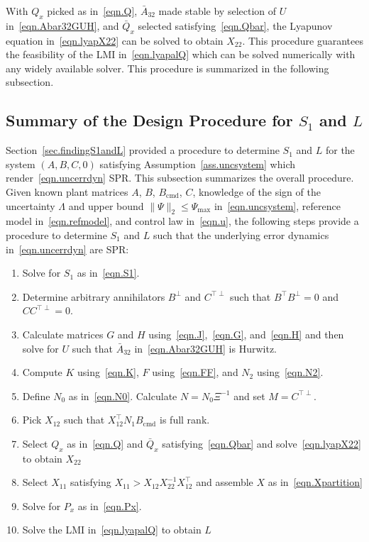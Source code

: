 With $Q_{x}$ picked as in\ \eqref{eqn.Q}, $\bar{A}_{32}$ made stable by selection of $U$ in\ \eqref{eqn.Abar32GUH}, and $\bar{Q}_{x}$ selected satisfying\ \eqref{eqn.Qbar}, the Lyapunov equation in\ \eqref{eqn.lyapX22} can be solved to obtain $X_{22}$.
This procedure guarantees the feasibility of the LMI in\ \eqref{eqn.lyapalQ} which can be solved numerically with any widely available solver.
This procedure is summarized in the following subsection.

\subsection{Summary of the Design Procedure for $S_{1}$ and $L$}\label{sec.designprocedure}

Section~\ref{sec.findingS1andL} provided a procedure to determine $S_{1}$ and $L$ for the system $(A,B,C,0)$ satisfying Assumption~\ref{ass.uncsystem} which render\ \eqref{eqn.uncerrdyn} SPR.\@
This subsection summarizes the overall procedure.
Given known plant matrices $A$, $B$, $B_{\text{cmd}}$, $C$, knowledge of the sign of the uncertainty $\Lambda$ and upper bound $\|\Psi\|_{2}\leq\Psi_{\text{max}}$ in\ \eqref{eqn.uncsystem}, reference model in\ \eqref{eqn.refmodel}, and control law in\ \eqref{eqn.u}, the following steps provide a procedure to determine $S_{1}$ and $L$ such that the underlying error dynamics in\ \eqref{eqn.uncerrdyn} are SPR:\@

\begin{enumerate}[1.]
  \setlength{\itemsep}{0pt}
  \item{Solve for $S_{1}$ as in\ \eqref{eqn.S1}.}
  \item{Determine arbitrary annihilators $B^{\perp}$ and $C^{\top\perp}$ such that $B^{\top}B^{\perp}=0$ and $CC^{\top\perp}=0$.}
  \item{\label{step.U}Calculate matrices $G$ and $H$ using\ \eqref{eqn.J},\ \eqref{eqn.G}, and\ \eqref{eqn.H} and then solve for $U$ such that $\bar{A}_{32}$ in\ \eqref{eqn.Abar32GUH} is Hurwitz.}
  \item{Compute $K$ using\ \eqref{eqn.K}, $F$ using\ \eqref{eqn.FF}, and $N_{2}$ using\ \eqref{eqn.N2}.}
  \item{Define $N_{0}$ as in\ \eqref{eqn.N0}. Calculate $N=N_{0}\Xi^{-1}$ and set $M=C^{\top\perp}$.}
  \item{Pick $X_{12}$ such that $X_{12}^{\top}N_{1}B_{\text{cmd}}$ is full rank.}
  \item{\label{step.X22} Select $Q_{x}$ as in\ \eqref{eqn.Q} and $\bar{Q}_{x}$ satisfying\ \eqref{eqn.Qbar} and solve\ \eqref{eqn.lyapX22} to obtain $X_{22}$}
  \item{\label{step.X11} Select $X_{11}$ satisfying $X_{11}>X_{12}X_{22}^{-1}X_{12}^{\top}$ and assemble $X$ as in\ \eqref{eqn.Xpartition}}
  \item{Solve for $P_{x}$ as in\ \eqref{eqn.Px}.}
  \item{Solve the LMI in\ \eqref{eqn.lyapalQ} to obtain $L$}
\end{enumerate}

